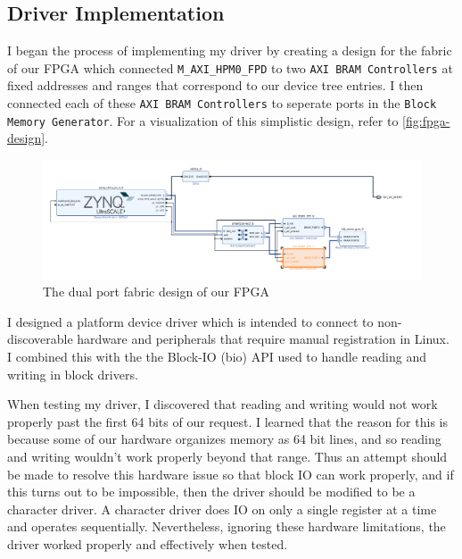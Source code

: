 \documentclass[psamsfonts]{amsart}
\theoremstyle{definition}
\theoremstyle{remark}
\numberwithin{equation}{section}
\begin{document}
\subsection{Driver Implementation} %

I began the process of implementing my driver by creating a design for the fabric of our FPGA which connected \texttt{M\_AXI\_HPM0\_FPD} to two \texttt{AXI BRAM Controllers} at fixed addresses and ranges that correspond to our device tree entries. I then connected each of these \texttt{AXI BRAM Controllers} to seperate ports in the \texttt{Block Memory Generator}. For a visualization of this simplistic design, refer to \autoref{fig:fpga-design}.

\begin{figure}[H]
    \centering
    \includegraphics[scale=0.5]{fpga_prog_img.png}
    \caption{The dual port fabric design of our FPGA}
    \label{fig:fpga-design}
\end{figure}

I designed a platform device driver which is intended to connect to non-discoverable hardware and peripherals that require manual registration in Linux. I combined this with the the Block-IO (bio) API used to handle reading and writing in block drivers.

When testing my driver, I discovered that reading and writing would not work properly past the first 64 bits of our request. I learned that the reason for this is because some of our hardware organizes memory as 64 bit lines, and so reading and writing wouldn't work properly beyond that range. Thus an attempt should be made to resolve this hardware issue so that block IO can work properly, and if this turns out to be impossible, then the driver should be modified to be a character driver. A character driver does IO on only a single register at a time and operates sequentially. Nevertheless, ignoring these hardware limitations, the driver worked properly and effectively when tested. 
\end{document}
